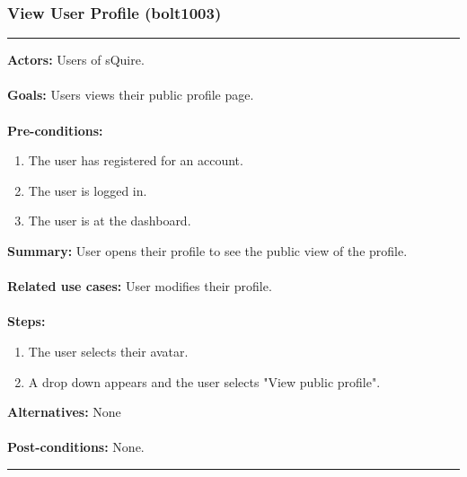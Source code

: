 \documentclass[11pt]{report}
\begin{document}
\subsubsection{View User Profile (bolt1003)}
\vspace{2pt}
\hrule
\vspace{8pt}
 \textbf{Actors:} Users of sQuire. \\ \\
\textbf{Goals:} Users views their public profile page. \\ \\
 \textbf{Pre-conditions:} \begin{enumerate}
  \item The user has registered for an account.
  \item The user is logged in.
  \item The user is at the dashboard.
 \end{enumerate}
 \textbf{Summary:} User opens their profile to see the public view of the profile.\\ \\
\textbf{Related use cases:} User modifies their profile. \\ \\
\textbf{Steps:} \begin{enumerate}
  \item The user selects their avatar.
  \item A drop down appears and the user selects "View public profile".
 \end{enumerate}
 \textbf{Alternatives:} None \\ \\
 \textbf{Post-conditions:} None. \\
\vspace{8pt}
\hrule
\newpage
\end{document}
